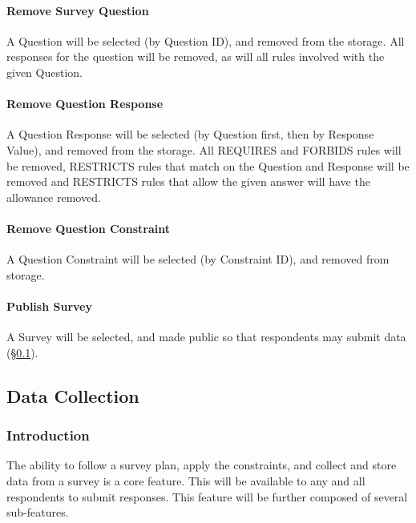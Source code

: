 \documentclass[10pt,letter]{report}
\def\hl#1{#1}
\begin{document}
\paragraph{Remove Survey Question}
\label{sec:remove-surv-quest}

A Question will be selected (by Question ID), and removed from the
storage.  All responses for the question will be removed, as will all
rules involved with the given Question.

\paragraph{Remove Question Response}
\label{sec:remove-quest-resp}

A Question Response will be selected (by Question first, then by
Response Value), and removed from the storage.  All REQUIRES and
FORBIDS rules will be removed, RESTRICTS rules that match on the
Question and Response will be removed and RESTRICTS rules that allow
the given answer will have the allowance removed.

\paragraph{Remove Question Constraint}
\label{sec:remove-quest-constr}

A Question Constraint will be selected (by Constraint ID), and removed
from storage.

\paragraph{Publish Survey}
\label{sec:publish-survey}

A Survey will be selected, and made public so that \hl{respondents} may
submit data (\S\ref{sec:data-collection}).

\subsection{Data Collection}
\label{sec:data-collection}

\subsubsection{Introduction}
\label{sec:introduction-collection}

The ability to follow a survey plan, apply the constraints, and
collect and store data from a survey is a core feature.  This will be
available to any and all respondents to submit responses.  This feature
will be further composed of several sub-features.
\end{document}
